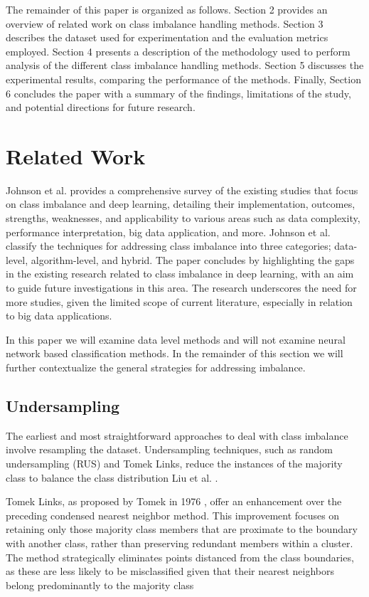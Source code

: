 \documentclass[journal]{IEEEtran}
\begin{document}
	The remainder of this paper is organized as follows. Section 2 provides an overview of related work on class imbalance handling methods. Section 3 describes the dataset used for experimentation and the evaluation metrics employed. Section 4 presents a description of the methodology used to perform analysis of the different class imbalance handling methods. Section 5 discusses the experimental results, comparing the performance of the methods. Finally, Section 6 concludes the paper with a summary of the findings, limitations of the study, and potential directions for future research.
	
	\section{Related Work}
	\label{sec:related_work}

	Johnson et al. \cite{johnson2019} provides a comprehensive survey of the existing studies that focus on class imbalance and deep learning, detailing their implementation, outcomes, strengths, weaknesses, and applicability to various areas such as data complexity, performance interpretation, big data application, and more. Johnson et al. classify the techniques for addressing class imbalance into three categories; data-level, algorithm-level, and hybrid.
	The paper concludes by highlighting the gaps in the existing research related to class imbalance in deep learning, with an aim to guide future investigations in this area. The research underscores the need for more studies, given the limited scope of current literature, especially in relation to big data applications.
	
	In this paper we will examine data level methods and will not examine neural network based classification methods. In the remainder of this section we will further contextualize the general strategies for addressing imbalance.
	
	\subsection{Undersampling}
	
	The earliest and most straightforward approaches to deal with class imbalance involve resampling the dataset. Undersampling techniques, such as random undersampling (RUS) and Tomek Links, reduce the instances of the majority class to balance the class distribution Liu et al. \cite{liu2009}. 

	Tomek Links, as proposed by Tomek in 1976 \cite{tomek1976}, offer an enhancement over the preceding condensed nearest neighbor method. This improvement focuses on retaining only those majority class members that are proximate to the boundary with another class, rather than preserving redundant members within a cluster. The method strategically eliminates points distanced from the class boundaries, as these are less likely to be misclassified given that their nearest neighbors belong predominantly to the majority class
\end{document}
